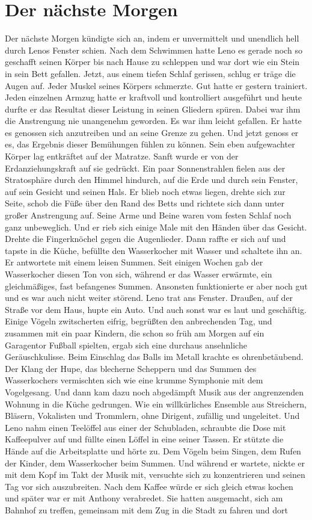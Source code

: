 \documentclass[ngerman,smalldemyvopaper,11pt,oneside,onecolumn,openright,extrafontsizes]{memoir}
\begin{document}
\chapter{Der nächste Morgen}
Der nächste Morgen kündigte sich an, indem er unvermittelt und unendlich hell durch Lenos Fenster schien. Nach dem Schwimmen hatte Leno es gerade noch so geschafft seinen Körper bis nach Hause zu schleppen und war dort wie ein Stein in sein Bett gefallen. Jetzt, aus einem tiefen Schlaf gerissen, schlug er träge die Augen auf. Jeder Muskel seines Körpers schmerzte. Gut hatte er gestern trainiert. Jeden einzelnen Armzug hatte er kraftvoll und kontrolliert ausgeführt und heute durfte er das Resultat dieser Leistung in seinen Gliedern spüren. Dabei war ihm die Anstrengung nie unangenehm geworden. Es war ihm leicht gefallen. Er hatte es genossen sich anzutreiben und an seine Grenze zu gehen. Und jetzt genoss er es, das Ergebnis dieser Bemühungen fühlen zu können. Sein eben aufgewachter Körper lag entkräftet auf der Matratze. Sanft wurde er von der Erdanziehungskraft auf sie gedrückt. Ein paar Sonnenstrahlen fielen aus der Stratosphäre durch den Himmel hindurch, auf die Erde und durch sein Fenster, auf sein Gesicht und seinen Hals. Er blieb noch etwas liegen, drehte sich zur Seite, schob die Füße über den Rand des Betts und richtete sich dann unter großer Anstrengung auf. Seine Arme und Beine waren vom festen Schlaf noch ganz unbeweglich. Und er rieb sich einige Male mit den Händen über das Gesicht. Drehte die Fingerknöchel gegen die Augenlieder. Dann raffte er sich auf und tapste in die Küche, befüllte den Wasserkocher mit Wasser und schaltete ihn an. Er antwortete mit einem leisen Summen. Seit einigen Wochen gab der Wasserkocher diesen Ton von sich, während er das Wasser erwärmte, ein gleichmäßiges, fast befangenes Summen. Ansonsten funktionierte er aber noch gut und es war auch nicht weiter störend. Leno trat ans Fenster. Draußen, auf der Straße vor dem Haus, hupte ein Auto. Und auch sonst war es laut und geschäftig. Einige Vögeln zwitscherten eifrig, begrüßten den anbrechenden Tag, und zusammen mit ein paar Kindern, die schon so früh am Morgen auf ein Garagentor Fußball spielten, ergab sich eine durchaus ansehnliche Geräuschkulisse. Beim Einschlag das Balls im Metall krachte es ohrenbetäubend. Der Klang der Hupe, das blecherne Scheppern und das Summen des Wasserkochers vermischten sich wie eine krumme Symphonie mit dem Vogelgesang. Und dann kam dazu noch abgedämpft Musik aus der angrenzenden Wohnung in die Küche gedrungen. Wie ein willkürliches Ensemble aus Streichern, Bläsern, Vokalisten und Trommlern, ohne Dirigent, zufällig und ungeleitet. Und Leno nahm einen Teelöffel aus einer der Schubladen, schraubte die Dose mit Kaffeepulver auf und füllte einen Löffel in eine seiner Tassen. Er stützte die Hände auf die Arbeitsplatte und hörte zu. Dem Vögeln beim Singen, dem Rufen der Kinder, dem Wasserkocher beim Summen. Und während er wartete, nickte er mit dem Kopf im Takt der Musik mit, versuchte sich zu konzentrieren und seinen Tag vor sich auszubreiten. Nach dem Kaffee würde er sich gleich etwas kochen und später war er mit Anthony verabredet. Sie hatten ausgemacht, sich am Bahnhof zu treffen, gemeinsam mit dem Zug in die Stadt zu fahren und dort 
\end{document}
